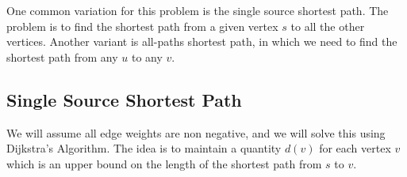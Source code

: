 One common variation for this problem is the single source shortest
path. The problem is to find the shortest path from a given vertex $s$
to all the other vertices. Another variant is all-paths shortest path,
in which we need to find the shortest path from any $u$ to any
$v$.

\subsection{Single Source Shortest Path}

We will assume all edge weights are non negative, and we will solve
this using Dijkstra's Algorithm. The idea is to maintain a quantity $d
(v)$ for each vertex $v$ which is an upper bound on the length of the
shortest path from $s$ to $v$.










